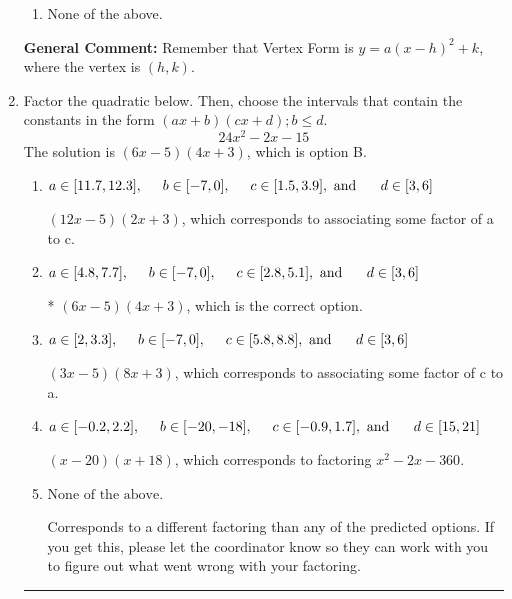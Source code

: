 \documentclass{extbook}[14pt]
\newcommand{\litem}[1]{\item #1

\rule{\textwidth}{0.4pt}}
\begin{document}
\begin{enumerate}
{\begin{enumerate}[label=\Alph*.]
\begin{multicols}{2}
\end{multicols}\item None of the above.\end{enumerate}
\textbf{General Comment:} Remember that Vertex Form is $y = a(x-h)^2+k$, where the vertex is $(h, k)$.
}
\litem{
Factor the quadratic below. Then, choose the intervals that contain the constants in the form $(ax+b)(cx+d); b \leq d.$
\[ 24x^{2} -2 x -15 \]
The solution is \( (6x -5)(4x + 3) \), which is option B.\begin{enumerate}[label=\Alph*.]
\item \( a \in [11.7, 12.3], \hspace*{5mm} b \in [-7, 0], \hspace*{5mm} c \in [1.5, 3.9], \text{ and } \hspace*{5mm} d \in [3, 6] \)

 $(12x -5)(2x + 3)$, which corresponds to associating some factor of a to c.
\item \( a \in [4.8, 7.7], \hspace*{5mm} b \in [-7, 0], \hspace*{5mm} c \in [2.8, 5.1], \text{ and } \hspace*{5mm} d \in [3, 6] \)

* $(6x -5)(4x + 3)$, which is the correct option.
\item \( a \in [2, 3.3], \hspace*{5mm} b \in [-7, 0], \hspace*{5mm} c \in [5.8, 8.8], \text{ and } \hspace*{5mm} d \in [3, 6] \)

 $(3x -5)(8x + 3)$, which corresponds to associating some factor of c to a.
\item \( a \in [-0.2, 2.2], \hspace*{5mm} b \in [-20, -18], \hspace*{5mm} c \in [-0.9, 1.7], \text{ and } \hspace*{5mm} d \in [15, 21] \)

 $(x -20)(x + 18)$, which corresponds to factoring $x^{2} -2 x -360$.
\item \( \text{None of the above.} \)

 Corresponds to a different factoring than any of the predicted options. If you get this, please let the coordinator know so they can work with you to figure out what went wrong with your factoring.
\end{enumerate}

}
\end{enumerate}
\end{document}
